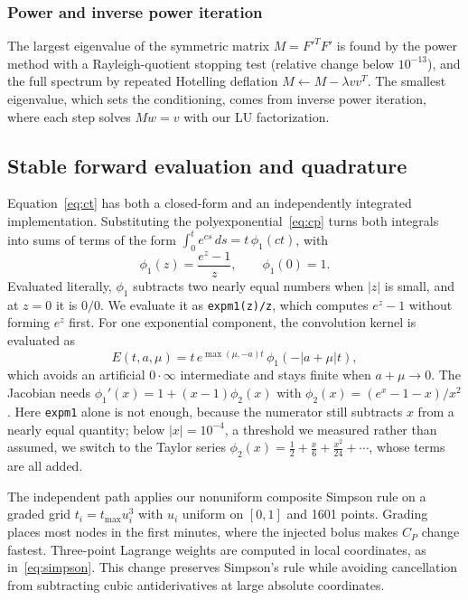 \documentclass[sigconf,nonacm]{acmart}
\begin{document}
\subsubsection{Power and inverse power iteration}
The largest eigenvalue of the symmetric matrix $M=F'^TF'$ is found by the power method with a Rayleigh-quotient stopping test (relative change below $10^{-13}$), and the full spectrum by repeated Hotelling deflation $M\leftarrow M-\lambda vv^T$. The smallest eigenvalue, which sets the conditioning, comes from inverse power iteration, where each step solves $Mw=v$ with our LU factorization.

\subsection{Stable forward evaluation and quadrature}

Equation~\eqref{eq:ct} has both a closed-form and an independently integrated implementation. Substituting the polyexponential~\eqref{eq:cp} turns both integrals into sums of terms of the form $\int_0^te^{cs}\,ds=t\,\phi_1(ct)$, with
\begin{equation}
\phi_1(z)=\frac{e^z-1}{z},\qquad \phi_1(0)=1 .
\label{eq:phi1}
\end{equation}
Evaluated literally, $\phi_1$ subtracts two nearly equal numbers when $|z|$ is small, and at $z=0$ it is $0/0$. We evaluate it as \texttt{expm1(z)/z}, which computes $e^z-1$ without forming $e^z$ first. For one exponential component, the convolution kernel is evaluated as
\begin{equation}
E(t,a,\mu)=t\,e^{\max(\mu,-a)t}\,\phi_1(-|a+\mu|t),
\label{eq:stablekernel}
\end{equation}
which avoids an artificial $0\cdot\infty$ intermediate and stays finite when $a+\mu\to0$. The Jacobian needs $\phi_1'(x)=1+(x-1)\phi_2(x)$ with $\phi_2(x)=(e^x-1-x)/x^2$. Here \texttt{expm1} alone is not enough, because the numerator still subtracts $x$ from a nearly equal quantity; below $|x|=10^{-4}$, a threshold we measured rather than assumed, we switch to the Taylor series $\phi_2(x)=\tfrac12+\tfrac{x}{6}+\tfrac{x^2}{24}+\cdots$, whose terms are all added.

The independent path applies our nonuniform composite Simpson rule on a graded grid $t_i=t_{\max}u_i^3$ with $u_i$ uniform on $[0,1]$ and 1601 points. Grading places most nodes in the first minutes, where the injected bolus makes $C_P$ change fastest. Three-point Lagrange weights are computed in local coordinates, as in~\eqref{eq:simpson}. This change preserves Simpson's rule while avoiding cancellation from subtracting cubic antiderivatives at large absolute coordinates.
\end{document}
